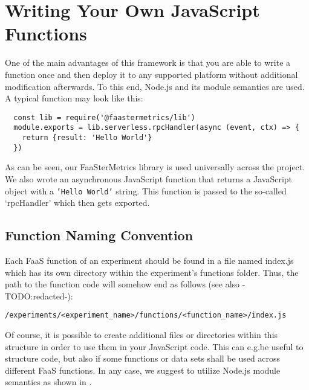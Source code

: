 \documentclass[../main.tex]{subfiles}
\begin{document}
\section{Writing Your Own JavaScript Functions}\label{sec:jsFunctions}

One of the main advantages of this framework is that you are able to write a function once 
and then deploy it to any supported platform without additional modification afterwards.
To this end, Node.js and its module semantics are used. A typical function may look like this:

\begin{tcolorbox}
\begin{verbatim}
  const lib = require('@faastermetrics/lib')
  module.exports = lib.serverless.rpcHandler(async (event, ctx) => {
    return {result: 'Hello World'}
  })
\end{verbatim}
\end{tcolorbox}

As can be seen, our FaaSterMetrics library is used universally across the project. 
We also wrote an asynchronous JavaScript function that returns a JavaScript object with a \texttt{'Hello World'} string. 
This function is passed to the so-called `rpcHandler' which then gets exported. 

\subsection{Function Naming Convention}

Each FaaS function of an experiment should be found in a file named index.js which has its own directory within the experiment's functions folder.
Thus, the path to the function code will somehow end as follows (see also -TODO:\@ redacted-):

\begin{tcolorbox}
  \texttt{/experiments/<experiment\_name>/functions/<function\_name>/index.js}
\end{tcolorbox}

Of course, it is possible to create additional files or directories within this structure in order to use them in your JavaScript code.
This can e.g.\@ be useful to structure code, but also if some functions or data sets shall be used across different FaaS functions.
In any case, we suggest to utilize Node.js module semantics as shown in .
\end{document}
